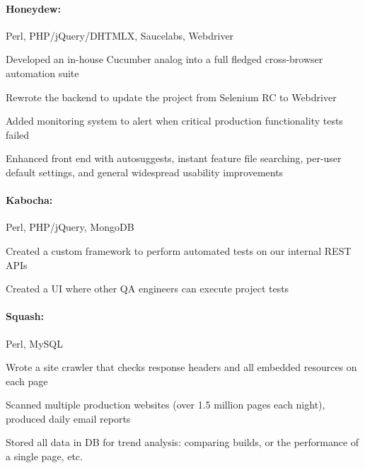 \begin{position}

  \paragraph{Honeydew:} Perl, PHP/jQuery/DHTMLX, Saucelabs, Webdriver
  \begin{myitem}
  \item Developed an in-house Cucumber analog into a full fledged cross-browser automation suite
  \item Rewrote the backend to update the project from Selenium RC to Webdriver
  \item Added monitoring system to alert when critical production functionality tests failed
  \item Enhanced front end with autosuggests, instant feature file searching, per-user default
    settings, and general widespread usability improvements
  \end{myitem}
%
  \paragraph{Kabocha:} Perl, PHP/jQuery, MongoDB
  \begin{myitem}
  \item Created a custom framework to perform automated tests on our internal REST APIs
  \item Created a UI where other QA engineers can execute project tests
  \end{myitem}
%
  \paragraph{Squash:} Perl, MySQL
  \begin{myitem}
  \item Wrote a site crawler that checks response headers and all embedded resources on each page
  \item Scanned multiple production websites (over 1.5 million pages each night), produced daily email reports
  \item Stored all data in DB for trend analysis: comparing builds, or the performance of a single page, etc.
  \end{myitem}
%

\end{position}

